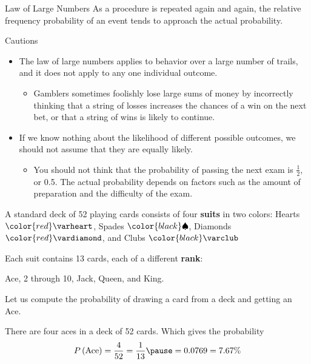 \documentclass{beamer}
\newcommand{\suitheart}[1][]{{\color{red}\text{#1}\varheart}}
\newcommand{\suitspade}[1][]{{\color{black}\text{#1}\spadesuit}}
\newcommand{\suitdiamond}[1][]{{\color{red}\text{#1}\vardiamond}}
\newcommand{\suitclub}[1][]{{\color{black}\text{#1}\varclub}}
\newcommand{\prob}[1]{P\left(#1\right)}
\begin{document}
\begin{frame}
\begin{block}{Law of Large Numbers}
As a procedure is repeated again and again, the relative frequency probability of an event tends to approach the actual probability.
\end{block}\pause

\begin{block}{Cautions}
\begin{itemize}
\item The law of large numbers applies to behavior over a large number of trails, and it does not apply to any one individual outcome.\pause
\begin{itemize}
\item Gamblers sometimes foolishly lose large sums of money by incorrectly thinking that a string of losses increases the chances of a win on the next bet, or that a string of wins is likely to continue.
\end{itemize}\pause
\item If we know nothing about the likelihood of different possible outcomes, we should not assume that they are equally likely.\pause
\begin{itemize}
\item You should not think that the probability of passing the next exam is $\tfrac{1}{2}$, or 0.5. The actual probability depends on factors such as the amount of preparation and the difficulty of the exam.
\end{itemize}
\end{itemize}
\end{block}
\end{frame}

\begin{frame}
\begin{definition}
A standard deck of 52 playing cards consists of four \textbf{suits} in two colors: 
Hearts $\suitheart$, Spades $\suitspade$, Diamonds $\suitdiamond$, and Clubs $\suitclub$

\vspace{2mm}
Each suit contains 13 cards, each of a different \textbf{rank}: 

Ace, 2 through 10, Jack, Queen, and King.
\end{definition}\pause

\begin{example}
Let us compute the probability of drawing a card from a deck and getting an Ace.\pause

\vspace{2mm}
There are four aces in a deck of 52 cards. Which gives the probability
\begin{equation*}
\prob{\text{Ace}}=\dfrac{4}{52}=\dfrac{1}{13}\pause
= 0.0769=7.67\%
\end{equation*}
\end{example}
\end{frame}
\end{document}
